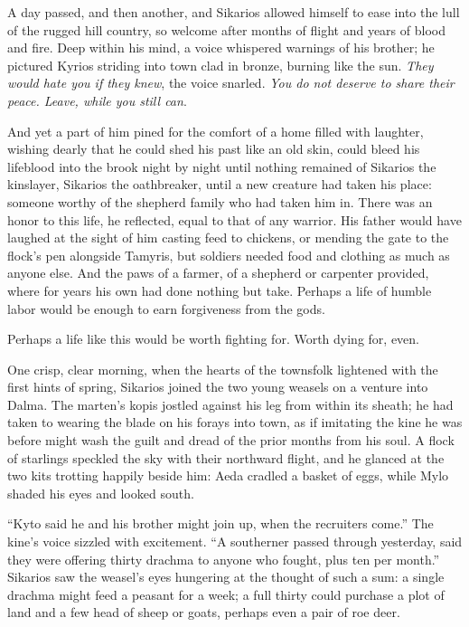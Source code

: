 \secdiv

\noindent A day passed, and then another, and Sikarios allowed himself to ease into the lull of the rugged hill country, so welcome after months of flight and years of blood and fire. Deep within his mind, a voice whispered warnings of his brother; he pictured Kyrios striding into town clad in bronze, burning like the sun. \emph{They would hate you if they knew}, the voice snarled. \emph{You do not deserve to share their peace. Leave, while you still can}.

And yet a part of him pined for the comfort of a home filled with laughter, wishing dearly that he could shed his past like an old skin, could bleed his lifeblood into the brook night by night until nothing remained of Sikarios the kinslayer, Sikarios the oathbreaker, until a new creature had taken his place: someone worthy of the shepherd family who had taken him in. There was an honor to this life, he reflected, equal to that of any warrior. His father would have laughed at the sight of him casting feed to chickens, or mending the gate to the flock's pen alongside Tamyris, but soldiers needed food and clothing as much as anyone else. And the paws of a farmer, of a shepherd or carpenter provided, where for years his own had done nothing but take. Perhaps a life of humble labor would be enough to earn forgiveness from the gods.

Perhaps a life like this would be worth fighting for. Worth dying for, even.

One crisp, clear morning, when the hearts of the townsfolk lightened with the first hints of spring, Sikarios joined the two young weasels on a venture into Dalma. The marten's kopis jostled against his leg from within its sheath; he had taken to wearing the blade on his forays into town, as if imitating the kine he was before might wash the guilt and dread of the prior months from his soul. A flock of starlings speckled the sky with their northward flight, and he glanced at the two kits trotting happily beside him: Aeda cradled a basket of eggs, while Mylo shaded his eyes and looked south.

``Kyto said he and his brother might join up, when the recruiters come.'' The kine's voice sizzled with excitement. ``A southerner passed through yesterday, said they were offering thirty drachma to anyone who fought, plus ten per month.'' Sikarios saw the weasel's eyes hungering at the thought of such a sum: a single drachma might feed a peasant for a week; a full thirty could purchase a plot of land and a few head of sheep or goats, perhaps even a pair of roe deer.

